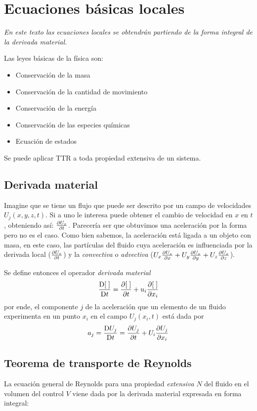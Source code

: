 
\section{Ecuaciones básicas locales}
\textit{En este texto las ecuaciones locales se obtendrán partiendo de la forma integral de la derivada material.}

Las leyes básicas de la física son:
\begin{itemize}
    \item Conservación de la masa
    \item Conservación de la cantidad de movimiento
    \item Conservación de la energía
    \item Conservación de las especies químicas
    \item Ecuación de estados 
\end{itemize}
Se puede aplicar TTR a toda propiedad extensiva de un sistema. 
\subsection{Derivada material}
Imagine que se tiene un flujo que puede ser descrito por un campo de velocidades $U_j(x,y,z,t)$. Si a uno le interesa puede obtener el cambio de velocidad en $x$ en $t$, obteniendo así: $\frac{\partial U_x}{\partial t}$. Parecería ser que obtuvimos una aceleración por la forma pero no es el caso. Como bien sabemos, la aceleración está ligada a un objeto con masa, en este caso, las partículas del fluido cuya aceleración es influenciada por la derivada local ($\frac{\partial U_x}{\partial t}$) y la \textit{convectiva} o \textit{advectiva} ($U_x\frac{\partial U_x}{\partial x}+U_y\frac{\partial U_x}{\partial y}+U_z\frac{\partial U_x}{\partial z}$).

Se define entonces el operador \textit{derivada material}
\[
\frac{\textrm{D} [\;]}{\textrm{D} t}=\frac{\partial [\;]}{\partial t}+u_i\frac{\partial [\;]}{\partial x_i}
\]
por ende, el componente $j$ de la aceleración que un elemento de un fluido experimenta en un punto $x_i$ en el campo $U_j(x_i,t)$ está dada por
\[
a_j=\frac{\textrm{D} U_j}{\textrm{D} t}=\frac{\partial U_j}{\partial t}+U_i\frac{\partial U_j}{\partial x_i}
\]

\subsection{Teorema de transporte de Reynolds}

La ecuación general de Reynolds para una propiedad \textit{extensiva} $N$ del fluido en el volumen del control $V$ viene dada por la derivada material expresada en forma integral:

